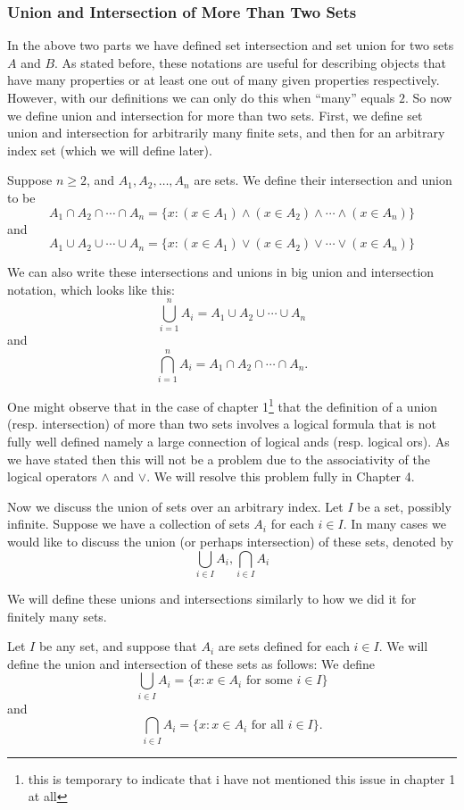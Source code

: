 \subsubsection{Union and Intersection of More Than Two Sets}

In the above two parts we have defined set intersection and set union for two sets $A$ and $B$. As stated before, these notations are useful for describing objects that have many properties or at least one out of many given properties respectively. However, with our definitions we can only do this when ``many'' equals $2$. So now we define union and intersection for more than two sets. First, we define set union and intersection for arbitrarily many finite sets, and then for an arbitrary index set (which we will define later).

\begin{definition}
Suppose $n \geq 2$, and $A_1, A_2, \dots, A_n$ are sets. We define their intersection and union to be
\[A_1 \cap A_2 \cap \cdots \cap A_n = \{x \colon (x \in A_1) \land (x \in A_2) \land \cdots \land (x \in A_n)\}\]
and
\[A_1 \cup A_2 \cup \cdots \cup A_n = \{x \colon (x \in A_1) \lor (x \in A_2) \lor \cdots \lor (x \in A_n)\}\]

We can also write these intersections and unions in big union and intersection notation, which looks like this:
\[\bigcup_{i = 1}^nA_i = A_1 \cup A_2 \cup \cdots \cup A_n\]
and 
\[\bigcap_{i = 1}^nA_i = A_1 \cap A_2 \cap \cdots \cap A_n.\]
\end{definition}

One might observe that in the case of chapter 1\footnote{this is temporary to indicate that i have not mentioned this issue in chapter 1 at all} that the definition of a union (resp. intersection) of more than two sets involves a logical formula that is not fully well defined namely a large connection of logical ands (resp. logical ors). As we have stated then this will not be a problem due to the associativity of the logical operators $\land$ and $\lor$. We will resolve this problem fully in Chapter 4. %

Now we discuss the union of sets over an arbitrary index. Let $I$ be a set, possibly infinite. Suppose we have a collection of sets $A_i$ for each $i \in I$. In many cases we would like to discuss the union (or perhaps intersection) of these sets, denoted by
\[\bigcup_{i \in I}A_i, \bigcap_{i \in I}A_i\]

We will define these unions and intersections similarly to how we did it for finitely many sets.
\begin{definition}
Let $I$ be any set, and suppose that $A_i$ are sets defined for each $i \in I$. We will define the union and intersection of these sets as follows: We define
\[\bigcup_{i \in I}A_i = \{x \colon \text{$x \in A_i$ for some $i \in I$}\}\]
and
\[\bigcap_{i \in I}A_i = \{x \colon \text{$x \in A_i$ for all $i \in I$}\}.\]
\end{definition}

